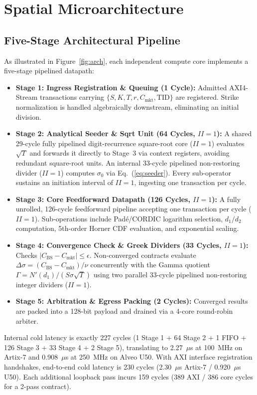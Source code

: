 \documentclass[sigconf,anonymous,review]{acmart}
\begin{document}
\section{Spatial Microarchitecture}
\subsection{Five-Stage Architectural Pipeline}
As illustrated in Figure~\ref{fig:arch}, each independent compute core implements a five-stage pipelined datapath:
\begin{itemize}
    \item \textbf{Stage 1: Ingress Registration \& Queuing (1 Cycle):} Admitted AXI4-Stream transactions carrying $\{S, K, T, r, C_{\text{mkt}}, \text{TID}\}$ are registered. Strike normalization is handled algebraically downstream, eliminating an initial division.
    \item \textbf{Stage 2: Analytical Seeder \& Sqrt Unit (64 Cycles, $II=1$):} A shared 29-cycle fully pipelined digit-recurrence square-root core ($II=1$) evaluates $\sqrt{T}$ and forwards it directly to Stage~3 via context registers, avoiding redundant square-root units. An internal 33-cycle pipelined non-restoring divider ($II=1$) computes $\sigma_0$ via Eq.~(\ref{eq:seeder}). Every sub-operator sustains an initiation interval of $II=1$, ingesting one transaction per cycle.
    \item \textbf{Stage 3: Core Feedforward Datapath (126 Cycles, $II=1$):} A fully unrolled, 126-cycle feedforward pipeline accepting one transaction per cycle ($II=1$). Sub-operations include Pad\'{e}/CORDIC logarithm selection, $d_1/d_2$ computation, 5th-order Horner CDF evaluation, and exponential scaling.
    \item \textbf{Stage 4: Convergence Check \& Greek Dividers (33 Cycles, $II=1$):} Checks $|C_{\text{BS}} - C_{\text{mkt}}| \le \epsilon$. Non-converged contracts evaluate $\Delta\sigma = (C_{\text{BS}} - C_{\text{mkt}})/\nu$ concurrently with the Gamma quotient $\Gamma = N'(d_1)/(S\sigma\sqrt{T})$ using two parallel 33-cycle pipelined non-restoring integer dividers ($II=1$).
    \item \textbf{Stage 5: Arbitration \& Egress Packing (2 Cycles):} Converged results are packed into a 128-bit payload and drained via a 4-core round-robin arbiter.
\end{itemize}
Internal cold latency is exactly 227 cycles (1 Stage 1 + 64 Stage 2 + 1 FIFO + 126 Stage 3 + 33 Stage 4 + 2 Stage 5), translating to 2.27~$\mu$s at 100~MHz on Artix-7 and 0.908~$\mu$s at 250~MHz on Alveo U50. With AXI interface registration handshakes, end-to-end cold latency is 230 cycles (2.30~$\mu$s Artix-7 / 0.920~$\mu$s U50). Each additional loopback pass incurs 159 cycles (389 AXI / 386 core cycles for a 2-pass contract).
\end{document}
